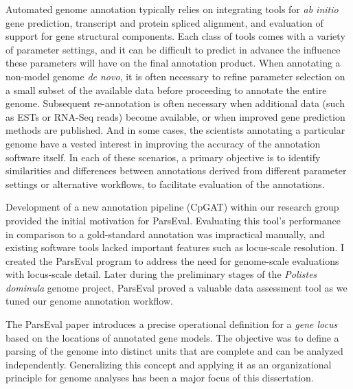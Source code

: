 Automated genome annotation typically relies on integrating tools for \textit{ab initio} gene prediction, transcript and protein spliced alignment, and evaluation of support for gene structural components.
Each class of tools comes with a variety of parameter settings, and it can be difficult to predict in advance the influence these parameters will have on the final annotation product.
When annotating a non-model genome \textit{de novo}, it is often necessary to refine parameter selection on a small subset of the available data before proceeding to annotate the entire genome.
Subsequent re-annotation is often necessary when additional data (such as ESTs or RNA-Seq reads) become available, or when improved gene prediction methods are published.
And in some cases, the scientists annotating a particular genome have a vested interest in improving the accuracy of the annotation software itself.
In each of these scenarios, a primary objective is to identify similarities and differences between annotations derived from different parameter settings or alternative workflows, to facilitate evaluation of the annotations.

Development of a new annotation pipeline (CpGAT) within our research group provided the initial motivation for ParsEval.
Evaluating this tool's performance in comparison to a gold-standard annotation was impractical manually, and existing software tools \cite{Keibler,Wang} lacked important features such as locus-scale resolution.
I created the ParsEval program to address the need for genome-scale evaluations with locus-scale detail.
Later during the preliminary stages of the \textit{Polistes dominula} genome project, ParsEval proved a valuable data assessment tool as we tuned our genome annotation workflow.

The ParsEval paper introduces a precise operational definition for a \textit{gene locus} based on the locations of annotated gene models.
The objective was to define a parsing of the genome into distinct units that are complete and can be analyzed independently.
Generalizing this concept and applying it as an organizational principle for genome analyses has been a major focus of this dissertation.

